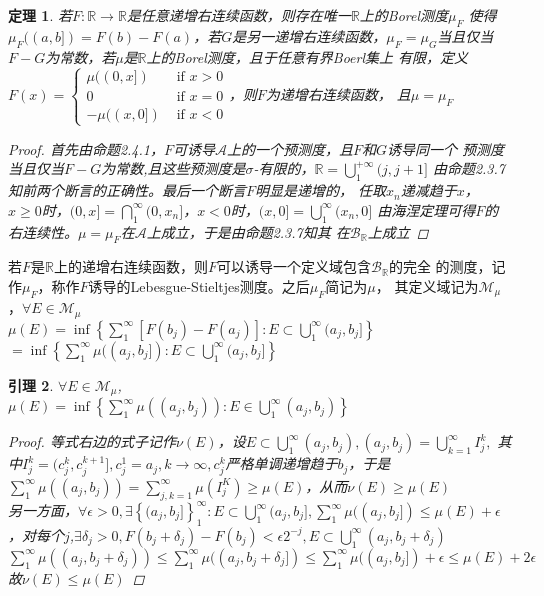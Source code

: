 \documentclass[12pt, a4paper, oneside]{ctexbook}
\newtheorem{theorem}{定理}[section]
\newtheorem{lemma}[theorem]{引理}
\begin{document}
\begin{theorem}
    若$F:\mathbb{R}\to\mathbb{R}$是任意递增右连续函数，则存在唯一$\mathbb{R}$上的Borel测度$\mu_{F}$
    使得$\mu_{F}((a,b])=F(b)-F(a)$，若$G$是另一递增右连续函数，$\mu_F=
    \mu_G$当且仅当$F-G$为常数，若$\mu$是$\mathbb{R}$上的Borel测度，且于任意有界Boerl集上
    有限，定义$F(x)=
    \begin{cases}
      \mu((0,x])& \text{ if } x>0 \\
      0& \text{ if } x=0 \\
      -\mu((x,0])& \text{ if } x<0
    \end{cases}
    $，则$F$为递增右连续函数，
    且$\mu=\mu_F$
    \begin{proof}
        首先由命题2.4.1，$F$可诱导$\mathcal{A}$上的一个预测度，且$F$和$G$诱导同一个
        预测度当且仅当$F-G$为常数,且这些预测度是$\sigma$-有限的，$\mathbb{R}=\bigcup_1^{+\infty}(j,j+1]$
        由命题2.3.7知前两个断言的正确性。最后一个断言$F$明显是递增的，
        任取$x_n$递减趋于$x$，$x\geq0$时，$(0,x]=\bigcap_1^{\infty}(0,x_n]$，$x<0$时，$(x,0]=\bigcup_1^{\infty}(x_n,0]$
        由海涅定理可得$F$的右连续性。$\mu=\mu_F$在$\mathcal{A}$上成立，于是由命题2.3.7知其
        在$\mathcal{B}_{\mathbb{R}}$上成立
    \end{proof}
\end{theorem}
若$F$是$\mathbb{R}$上的递增右连续函数，则$F$可以诱导一个定义域包含$\mathcal{B}_{\mathbb{R}}$的完全
的测度，记作$\mu_F$，称作$F$诱导的Lebesgue-Stieltjes测度。之后$\mu_F$简记为$\mu$，
其定义域记为$\mathcal{M}_{\mu}$，$\forall E\in\mathcal{M}_{\mu}$\\
$\mu(E)=\inf\left\{\sum_1^{\infty}[F(b_j)-F(a_j)]:E\subset\bigcup_1^{\infty}(a_j,b_j]\right\}$\\
$=\inf\left\{\sum_1^{\infty}\mu((a_j,b_j]):E\subset\bigcup_1^{\infty}(a_j,b_j]\right\}$\\
\begin{lemma}
    $\forall E\in\mathcal{M}_{\mu}$,\\
    $\mu(E)=\inf\left\{\sum_1^{\infty}\mu((a_j,b_j)):E\in\bigcup_1^{\infty}(a_j,b_j)\right\}$
    \begin{proof}
        等式右边的式子记作$\nu(E)$，设$E\subset\bigcup_1^{\infty}(a_j,b_j),(a_j,b_j)=\bigcup_{k=1}^{\infty}I_j^k,$
        其中$I_j^k=(c_j^k,c_j^{k+1}],c_j^1=a_j,k\to\infty,c_j^k$严格单调递增趋于$b_j$，于是\\
        $\sum_1^{\infty}\mu((a_j,b_j))=\sum_{j,k=1}^{\infty}\mu(I_j^K)\geq\mu(E)$，从而$\nu(E)\geq\mu(E)$\\
        另一方面，$\forall\epsilon>0,\exists\left\{(a_j,b_j]\right\}_1^{\infty}:E\subset\bigcup_1^{\infty}(a_j,b_j],\sum_1^{\infty}\mu((a_j,b_j])\leq\mu(E)+
        \epsilon$，对每个$j$,$\exists \delta_j>0,F(b_j+\delta_j)-F(b_j)<\epsilon2^{-j},E\subset\bigcup_1^{\infty}(a_j,b_j+\delta_j)$\\
        $\sum_1^{\infty}\mu((a_j,b_j+\delta_j))\leq\sum_1^{\infty}\mu((a_j,b_j+\delta_j])\leq\sum_1^{\infty}\mu((a_j,b_j])+\epsilon\leq\mu(E)+2\epsilon$\\
        故$\nu(E)\leq\mu(E)$
    \end{proof}
\end{lemma}
\end{document}
